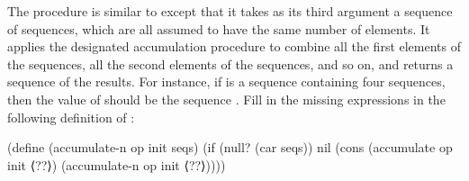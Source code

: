 \begin{exercise}
	\label{Exercise 2.36}
	The procedure  is similar to  except that it takes as its third argument a sequence of sequences, which are all assumed to have the same number of elements.
	It applies the designated accumulation procedure to combine all the first elements of the sequences, all the second elements of the sequences, and so on, and returns a sequence of the results.
	For instance, if  is a sequence containing four sequences,  then the value of  should be the sequence .
	Fill in the missing expressions in the following definition of :
	\begin{scheme}
	  (define (accumulate-n op init seqs)
	    (if (null? (car seqs))
	        nil
	        (cons (accumulate op init ⟨??⟩)
	              (accumulate-n op init ⟨??⟩))))
	\end{scheme}
\end{exercise}



